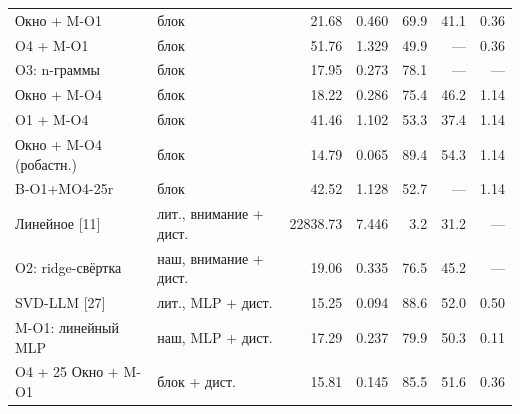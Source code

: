 \begin{tabular}{llrrrrr}
Окно + M-O1 & блок & 21.68 & 0.460 & 69.9 & 41.1 & 0.36 \\
O4 + M-O1 & блок & 51.76 & 1.329 & 49.9 & — & 0.36 \\
O3: n-граммы & блок & 17.95 & 0.273 & 78.1 & — & — \\
Окно + M-O4 & блок & 18.22 & 0.286 & 75.4 & 46.2 & 1.14 \\
O1 + M-O4 & блок & 41.46 & 1.102 & 53.3 & 37.4 & 1.14 \\
Окно + M-O4 (робастн.) & блок & 14.79 & 0.065 & 89.4 & 54.3 & 1.14 \\
B-O1+MO4-25r & блок & 42.52 & 1.128 & 52.7 & — & 1.14 \\
Линейное [11] & лит., внимание + дист. & 22838.73 & 7.446 & 3.2 & 31.2 & — \\
O2: ridge-свёртка & наш, внимание + дист. & 19.06 & 0.335 & 76.5 & 45.2 & — \\
SVD-LLM [27] & лит., MLP + дист. & 15.25 & 0.094 & 88.6 & 52.0 & 0.50 \\
M-O1: линейный MLP & наш, MLP + дист. & 17.29 & 0.237 & 79.9 & 50.3 & 0.11 \\
O4 + 25%
Окно + M-O1 & блок + дист. & 15.81 & 0.145 & 85.5 & 51.6 & 0.36 \\
\bottomrule
\end{tabular}

